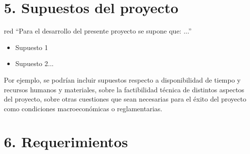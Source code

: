 \documentclass[
11pt, %
codirector, %
]{charter}
\begin{document}
\section{5. Supuestos del proyecto}
\label{sec:supuestos}

\begin{consigna}{red}
``Para el desarrollo del presente proyecto se supone que: ...''

\begin{itemize}
	\item Supuesto 1
	\item Supuesto 2...
\end{itemize}

Por ejemplo, se podrían incluir supuestos respecto a disponibilidad de tiempo y recursos humanos y materiales, sobre la factibilidad técnica de distintos aspectos del proyecto, sobre otras cuestiones que sean necesarias para el éxito del proyecto como condiciones macroeconómicas o reglamentarias.
\end{consigna}

\section{6. Requerimientos}
\label{sec:requerimientos}
\end{document}
